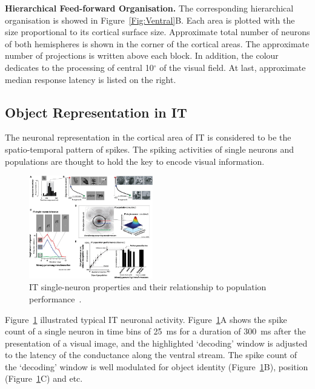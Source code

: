 \documentclass[journal]{journal}
\begin{document}
\textbf{Hierarchical Feed-forward Organisation.}
The corresponding hierarchical organisation is showed in Figure~\ref{Fig:Ventral}B.
Each area is plotted with the size proportional to its cortical surface size.
Approximate total number of neurons of both hemispheres is shown in the corner of the cortical areas.
The approximate number of projections is written above each block.
In addition, the colour dedicates to the processing of central 10$^\circ$ of the visual field.
At last, approximate median response latency is listed on the right.
%
\subsection{Object Representation in IT}
The neuronal representation in the cortical area of IT is considered to be the spatio-temporal pattern of spikes.
The spiking activities of single neurons and populations are thought to hold the key to encode visual information.
\begin{figure}[h!]
	\centering
	\includegraphics[width=0.48\textwidth]{pics/IT.jpg}
	\caption{	
		IT single-neuron properties and their relationship to population performance~\cite{dicarlo2012does}.
	}
	\label{Fig:IT}
\end{figure}

Figure~\ref{Fig:IT} illustrated typical IT neuronal activity.
Figure~\ref{Fig:IT}A shows the spike count of a single neuron in time bins of 25~ms for a duration of 300~ms after the presentation of a visual image, and the highlighted `decoding' window is adjusted to the latency of the conductance along the ventral stream. 
The spike count of the `decoding' window is well modulated for object identity (Figure~\ref{Fig:IT}B), position (Figure~\ref{Fig:IT}C) and etc.
\end{document}
